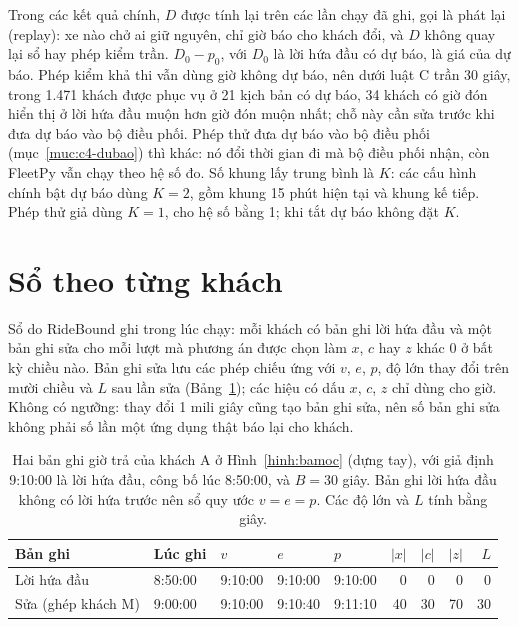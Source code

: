 Trong các kết quả chính, $D$ được tính lại trên các lần chạy đã ghi, gọi là phát lại (replay): xe nào chở ai giữ
nguyên, chỉ giờ báo cho khách đổi, và $D$ không quay lại sổ hay phép kiểm trần. $D_0 - p_0$, với $D_0$ là lời hứa
đầu có dự báo, là giá của dự báo. Phép kiểm khả thi vẫn dùng giờ không dự báo, nên dưới luật C trần 30 giây, trong
1.471 khách được phục vụ ở 21 kịch bản có dự báo, 34 khách có giờ đón hiển thị ở lời hứa đầu muộn hơn giờ đón
muộn nhất; chỗ này cần sửa trước khi đưa dự báo vào bộ điều phối. Phép thử đưa dự báo vào bộ điều phối
(mục~\ref{muc:c4-dubao}) thì khác: nó đổi thời gian đi mà bộ điều phối nhận, còn FleetPy vẫn chạy theo hệ số đo.
Số khung lấy trung bình là $K$: các cấu hình chính bật dự báo dùng $K = 2$, gồm khung 15 phút hiện tại và khung kế tiếp.
Phép thử giả dùng $K = 1$, cho hệ số bằng 1; khi tắt dự báo không đặt $K$.

\section{Sổ theo từng khách}
\label{muc:so}

Sổ do RideBound ghi trong lúc chạy: mỗi khách có bản ghi lời hứa đầu và một bản ghi sửa cho mỗi lượt mà phương án
được chọn làm $x$, $c$ hay $z$ khác 0 ở bất kỳ chiều nào. Bản ghi sửa lưu các phép chiếu ứng với $v$, $e$, $p$,
độ lớn thay đổi trên mười chiều và $L$ sau lần sửa (Bảng~\ref{bang:vidu-so}); các hiệu có dấu $x$, $c$, $z$ chỉ dùng
cho giờ. Không có ngưỡng: thay đổi 1 mili giây cũng tạo bản ghi sửa, nên số bản ghi sửa không phải số lần một ứng
dụng thật báo lại cho khách.

\begin{table}[htbp]
\centering
\caption{Hai bản ghi giờ trả của khách A ở Hình~\ref{hinh:bamoc} (dựng tay), với giả định 9:10:00 là lời hứa đầu,
công bố lúc 8:50:00, và $B = 30$ giây. Bản ghi lời hứa đầu không có lời hứa trước nên sổ quy ước $v = e = p$. Các
độ lớn và $L$ tính bằng giây.}
\label{bang:vidu-so}
\small
\begin{tabular}{@{}lllllrrrr@{}}
\toprule
\textbf{Bản ghi} & \textbf{Lúc ghi} & $v$ & $e$ & $p$ & $|x|$ & $|c|$ & $|z|$ & $L$\\
\midrule
Lời hứa đầu & 8:50:00 & 9:10:00 & 9:10:00 & 9:10:00 & 0 & 0 & 0 & 0\\
Sửa (ghép khách M) & 9:00:00 & 9:10:00 & 9:10:40 & 9:11:10 & 40 & 30 & 70 & 30\\
\bottomrule
\end{tabular}
\end{table}

